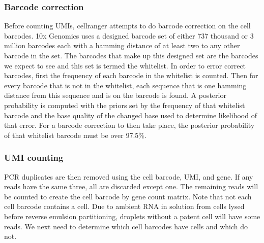 \subsubsection{Barcode correction}
\par{
Before counting UMIs, cellranger attempts to do barcode correction on the cell barcodes. 10x Genomics uses a designed barcode set of either 737 thousand or 3 million barcodes each with a hamming distance\cite{hamming} of at least two to any other barcode in the set. The barcodes that make up this designed set are the barcodes we expect to see and this set is termed the whitelist. In order to error correct barcodes, first the frequency of each barcode in the whitelist is counted. Then for every barcode that is not in the whitelist, each sequence that is one hamming distance from this sequence and is on the barcode is found. A posterior probability is computed with the priors set by the frequency of that whitelist barcode and the base quality of the changed base used to determine likelihood of that error. For a barcode correction to then take place, the posterior probability of that whitelist barcode must be over 97.5\%\cite{barcodecorrection}.
}

\subsubsection{UMI counting}

\par{
PCR duplicates are then removed using the cell barcode, UMI, and gene. If any reads have the same three, all are discarded except one. The remaining reads will be counted to create the cell barcode by gene count matrix. Note that not each cell barcode contains a cell. Due to ambient RNA in solution from cells lysed before reverse emulsion partitioning, droplets without a patent cell will have some reads. We next need to determine which cell barcodes have cells and which do not.
}



